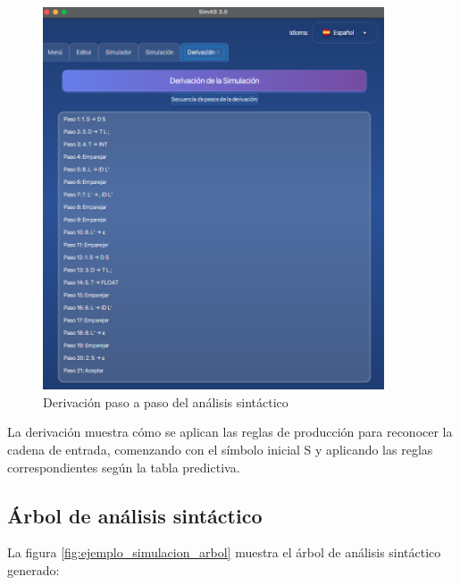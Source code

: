 \needspace{8cm}
\begin{figure}[H]
    \centering
    \includegraphics[width=0.9\textwidth]{figuras/ejemplo_practico/simulacion_derivacion1.png}
    \caption{Derivación paso a paso del análisis sintáctico}
    \label{fig:ejemplo_simulacion_derivacion}
\end{figure}

La derivación muestra cómo se aplican las reglas de producción para reconocer la cadena de entrada, comenzando con el símbolo inicial S y aplicando las reglas correspondientes según la tabla predictiva.

\subsection{Árbol de análisis sintáctico}

La figura \ref{fig:ejemplo_simulacion_arbol} muestra el árbol de análisis sintáctico generado:

